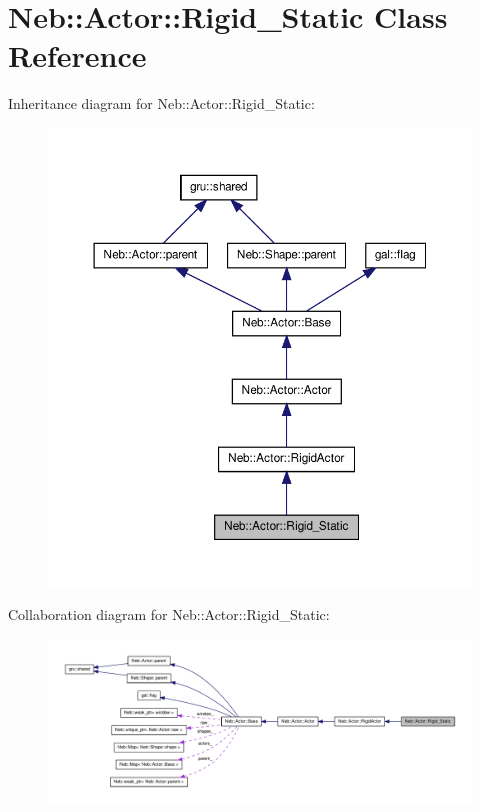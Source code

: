\hypertarget{classNeb_1_1Actor_1_1Rigid__Static}{\section{\-Neb\-:\-:\-Actor\-:\-:\-Rigid\-\_\-\-Static \-Class \-Reference}
\label{classNeb_1_1Actor_1_1Rigid__Static}
}


\-Inheritance diagram for \-Neb\-:\-:\-Actor\-:\-:\-Rigid\-\_\-\-Static\-:\nopagebreak
\begin{figure}[H]
\begin{center}
\leavevmode
\includegraphics[width=350pt]{classNeb_1_1Actor_1_1Rigid__Static__inherit__graph}
\end{center}
\end{figure}


\-Collaboration diagram for \-Neb\-:\-:\-Actor\-:\-:\-Rigid\-\_\-\-Static\-:\nopagebreak
\begin{figure}[H]
\begin{center}
\leavevmode
\includegraphics[width=350pt]{classNeb_1_1Actor_1_1Rigid__Static__coll__graph}
\end{center}
\end{figure}

